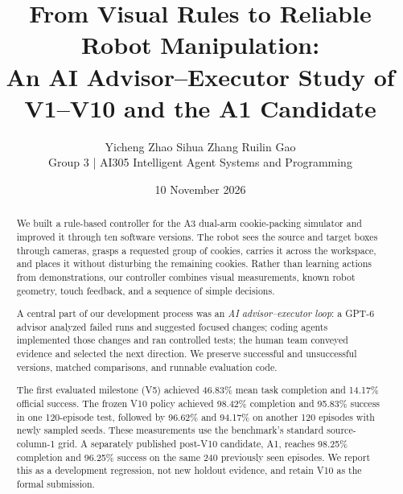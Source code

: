\documentclass[10pt,twocolumn]{article}
\title{\vspace{-1em}\textbf{From Visual Rules to Reliable Robot Manipulation:}\\An AI Advisor--Executor Study of V1--V10 and the A1 Candidate}
\author{Yicheng Zhao \qquad Sihua Zhang \qquad Ruilin Gao\\[0.15em]
\small Group 3 \quad | \quad AI305 Intelligent Agent Systems and Programming}
\date{\small 10 November 2026}
\begin{document}
\maketitle
\vspace{-1.0em}
\begin{abstract}
\noindent
We built a rule-based controller for the A3 dual-arm cookie-packing simulator and improved it through ten software versions. The robot sees the source and target boxes through cameras, grasps a requested group of cookies, carries it across the workspace, and places it without disturbing the remaining cookies. Rather than learning actions from demonstrations, our controller combines visual measurements, known robot geometry, touch feedback, and a sequence of simple decisions.

A central part of our development process was an \emph{AI advisor--executor loop}: a GPT-6 advisor analyzed failed runs and suggested focused changes; coding agents implemented those changes and ran controlled tests; the human team conveyed evidence and selected the next direction. We preserve successful and unsuccessful versions, matched comparisons, and runnable evaluation code.

The first evaluated milestone (V5) achieved 46.83\% mean task completion and 14.17\% official success. The frozen V10 policy achieved 98.42\% completion and 95.83\% success in one 120-episode test, followed by 96.62\% and 94.17\% on another 120 episodes with newly sampled seeds. These measurements use the benchmark's standard source-column-1 grid. A separately published post-V10 candidate, A1, reaches 98.25\% completion and 96.25\% success on the same 240 previously seen episodes. We report this as a development regression, not new holdout evidence, and retain V10 as the formal submission.
\end{abstract}
\vspace{-0.4em}







\end{document}
